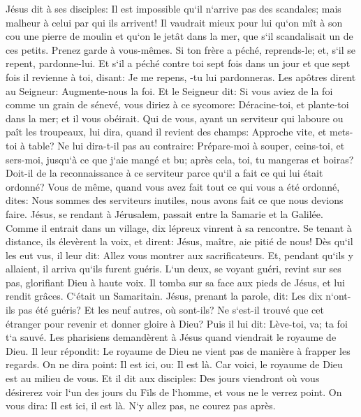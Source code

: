 \verse Jésus dit à ses disciples: Il est impossible qu`il n`arrive pas des scandales; mais malheur à celui par qui ils arrivent! 
\verse Il vaudrait mieux pour lui qu`on mît à son cou une pierre de moulin et qu`on le jetât dans la mer, que s`il scandalisait un de ces petits. 
\verse Prenez garde à vous-mêmes. Si ton frère a péché, reprends-le; et, s`il se repent, pardonne-lui. 
\verse Et s`il a péché contre toi sept fois dans un jour et que sept fois il revienne à toi, disant: Je me repens, -tu lui pardonneras. 
\verse Les apôtres dirent au Seigneur: Augmente-nous la foi. 
\verse Et le Seigneur dit: Si vous aviez de la foi comme un grain de sénevé, vous diriez à ce sycomore: Déracine-toi, et plante-toi dans la mer; et il vous obéirait. 
\verse Qui de vous, ayant un serviteur qui laboure ou paît les troupeaux, lui dira, quand il revient des champs: Approche vite, et mets-toi à table? 
\verse Ne lui dira-t-il pas au contraire: Prépare-moi à souper, ceins-toi, et sers-moi, jusqu`à ce que j`aie mangé et bu; après cela, toi, tu mangeras et boiras? 
\verse Doit-il de la reconnaissance à ce serviteur parce qu`il a fait ce qui lui était ordonné? 
\verse Vous de même, quand vous avez fait tout ce qui vous a été ordonné, dites: Nous sommes des serviteurs inutiles, nous avons fait ce que nous devions faire. 
\verse Jésus, se rendant à Jérusalem, passait entre la Samarie et la Galilée. 
\verse Comme il entrait dans un village, dix lépreux vinrent à sa rencontre. Se tenant à distance, ils élevèrent la voix, et dirent: 
\verse Jésus, maître, aie pitié de nous! 
\verse Dès qu`il les eut vus, il leur dit: Allez vous montrer aux sacrificateurs. Et, pendant qu`ils y allaient, il arriva qu`ils furent guéris. 
\verse L`un deux, se voyant guéri, revint sur ses pas, glorifiant Dieu à haute voix. 
\verse Il tomba sur sa face aux pieds de Jésus, et lui rendit grâces. C`était un Samaritain. 
\verse Jésus, prenant la parole, dit: Les dix n`ont-ils pas été guéris? Et les neuf autres, où sont-ils? 
\verse Ne s`est-il trouvé que cet étranger pour revenir et donner gloire à Dieu? 
\verse Puis il lui dit: Lève-toi, va; ta foi t`a sauvé. 
\verse Les pharisiens demandèrent à Jésus quand viendrait le royaume de Dieu. Il leur répondit: Le royaume de Dieu ne vient pas de manière à frapper les regards. 
\verse On ne dira point: Il est ici, ou: Il est là. Car voici, le royaume de Dieu est au milieu de vous. 
\verse Et il dit aux disciples: Des jours viendront où vous désirerez voir l`un des jours du Fils de l`homme, et vous ne le verrez point. 
\verse On vous dira: Il est ici, il est là. N`y allez pas, ne courez pas après. 
